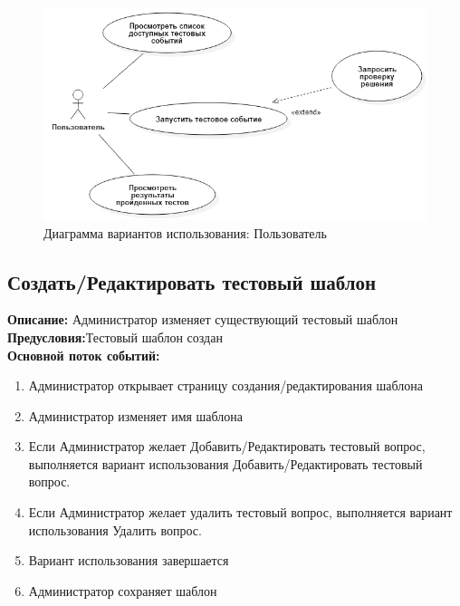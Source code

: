 \documentclass{article}
\begin{document}
    \begin{figure}[H]
        \includegraphics[width=\textwidth, center]{UseCase_User.png}
        \caption{Диаграмма вариантов использования: Пользователь}
    \end{figure}

    \subsection{Создать/Редактировать тестовый шаблон}
    \textbf{Описание:} Администратор изменяет существующий тестовый шаблон\\
    \textbf{Предусловия:}Тестовый шаблон создан\\
    \textbf{Основной поток событий:}
    \begin{enumerate}
        \item Администратор открывает страницу создания/редактирования шаблона
        \item Администратор изменяет имя шаблона
        \item Если Администратор желает Добавить/Редактировать тестовый вопрос, выполняется вариант использования Добавить/Редактировать тестовый вопрос.
        \item Если Администратор желает удалить тестовый вопрос, выполняется вариант использования Удалить вопрос.
        \item Вариант использования завершается
        \item Администратор сохраняет шаблон
    \end{enumerate} 
    
\end{document}
